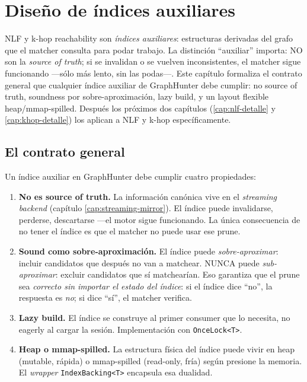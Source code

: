 \chapter{Diseño de índices auxiliares}
\label{cap:indices-auxiliares}

\begin{intuicion}
NLF y k-hop reachability son \emph{índices auxiliares}: estructuras
derivadas del grafo que el matcher consulta para podar trabajo. La
distinción ``auxiliar'' importa: NO son la \emph{source of truth};
si se invalidan o se vuelven inconsistentes, el matcher sigue
funcionando ---sólo más lento, sin las podas---. Este capítulo
formaliza el contrato general que cualquier índice auxiliar de
GraphHunter debe cumplir: no source of truth, soundness por
sobre-aproximación, lazy build, y un layout flexible
heap/mmap-spilled. Después los próximos dos capítulos
(\ref{cap:nlf-detalle} y \ref{cap:khop-detalle}) los aplican a NLF
y k-hop específicamente.
\end{intuicion}

\section{El contrato general}

Un índice auxiliar en GraphHunter debe cumplir cuatro propiedades:

\begin{enumerate}
    \item \textbf{No es source of truth.} La información canónica
    vive en el \emph{streaming backend} (capítulo
    \ref{cap:streaming-mirror}). El índice puede invalidarse,
    perderse, descartarse ---el motor sigue funcionando. La única
    consecuencia de no tener el índice es que el matcher no puede
    usar ese prune.
    \item \textbf{Sound como sobre-aproximación.} El índice puede
    \emph{sobre-aproximar}: incluir candidatos que después no van a
    matchear. NUNCA puede \emph{sub-aproximar}: excluir candidatos
    que sí matchearían. Eso garantiza que el prune sea
    \emph{correcto sin importar el estado del índice}: si el índice
    dice ``no'', la respuesta es \emph{no}; si dice ``sí'', el
    matcher verifica.
    \item \textbf{Lazy build.} El índice se construye al primer
    consumer que lo necesita, no eagerly al cargar la sesión.
    Implementación con \texttt{OnceLock<T>}.
    \item \textbf{Heap o mmap-spilled.} La estructura física del
    índice puede vivir en heap (mutable, rápida) o mmap-spilled
    (read-only, fría) según presione la memoria. El \emph{wrapper}
    \texttt{IndexBacking<T>} encapsula esa dualidad.
\end{enumerate}

